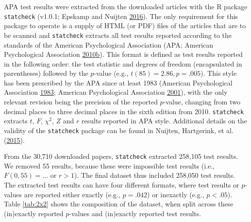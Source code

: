 \documentclass[a5paper]{book}
\begin{document}
APA test results were extracted from the downloaded articles with the R
package \texttt{statcheck} (v1.0.1; Epskamp and Nuijten
\protect\hyperlink{ref-statcheck}{2016}). The only requirement for this
package to operate is a supply of HTML (or PDF) files of the articles
that are to be scanned and \texttt{statcheck} extracts all test results
reported according to the standards of the American Psychological
Association (APA; American Psychological Association
\protect\hyperlink{ref-isbn:9781433805615}{2010}\protect\hyperlink{ref-isbn:9781433805615}{b}).
This format is defined as test results reported in the following order:
the test statistic and degrees of freedom (encapsulated in parentheses)
followed by the \(p\)-value (e.g., \(t(85)=2.86,p=.005\)). This style
has been prescribed by the APA since at least 1983 (American
Psychological Association
\protect\hyperlink{ref-American_Psychological_Association1983-yf}{1983};
American Psychological Association
\protect\hyperlink{ref-American_Psychological_Association2001-uw}{2001}),
with the only relevant revision being the precision of the reported
\(p\)-value, changing from two decimal places to three decimal places in
the sixth edition from 2010. \texttt{statcheck} extracts \(t\), \(F\),
\(\chi^{2}\), \(Z\) and \(r\) results reported in APA style. Additional
details on the validity of the \texttt{statcheck} package can be found
in Nuijten, Hartgerink, et al.
(\protect\hyperlink{ref-doi:10.3758ux2fs13428-015-0664-2}{2015}).

From the 30,710 downloaded papers, \texttt{statcheck} extracted 258,105
test results. We removed 55 results, because these were impossible test
results (i.e., \(F(0,55)=...\) or \(r>1\)). The final dataset thus
included 258,050 test results. The extracted test results can have four
different formats, where test results or \(p\)-values are reported
either exactly (e.g., \(p=.042\)) or inexactly (e.g., \(p<.05\)). Table
\ref{tab:2x2} shows the composition of the dataset, when split across
these (in)exactly reported \(p\)-values and (in)exactly reported test
results.

\begin{table}[!h]

\caption{\label{tab:2x2}Composition of extracted APA test results with respect to exact and inexact reporting of $p$-values or test statistics.}
\centering
{}
\end{table}
\end{document}
